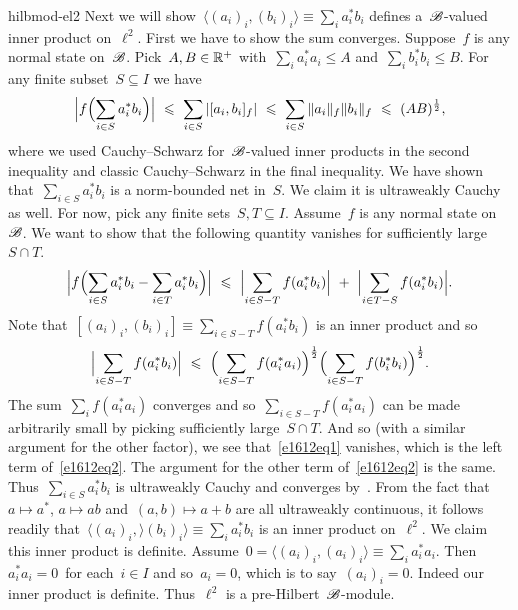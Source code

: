 \begin{solution}{hilbmod-el2}
    Next we will show~$\langle (a_i)_i , (b_i)_i \rangle \equiv
        \sum_i a_i^* b_i$ defines a~$\mathscr{B}$-valued inner product
        on~$\ell^2$.
    First we have to show the sum converges.
    Suppose~$f$ is any normal state on~$\mathscr{B}$.
Pick~$A,B\in \mathbb{R}^+$
    with~$\sum_i a_i^*a_i \leq A$
    and~$\sum_i b_i^*b_i \leq B$.
For any finite subset~$S \subseteq I$
    we have
\begin{equation*}
    \Bigl|f \Bigl( \sum_{ i \in S} a_i^*b_i \Bigr) \Bigr|
    \ \leq \  \sum_{i \in S} | [a_i,b_i]_f | \ \leq \ 
    \sum_{i \in S} \|a_i\|_f \|b_i\|_f
    \ \leq\ (AB)^{\frac{1}{2}},
\end{equation*}
where we used Cauchy--Schwarz for~$\mathscr{B}$-valued inner products
    in the second inequality and classic
    Cauchy--Schwarz in the final inequality.
We have shown that~$\sum_{i \in S} a_i^*b_i$
    is a norm-bounded net in~$S$.
    We claim it is ultraweakly Cauchy as well.
For now, pick any finite sets~$S,T \subseteq I$.
Assume~$f$ is any normal state on~$\mathscr{B}$.
We want to show that the following quantity vanishes
    for sufficiently large~$S \cap T$.
\begin{equation}\label{e1612eq2}
\Bigl| f \Bigl( \sum_{i \in S} a_i^*b_i
                - \sum_{i \in T} a_i^*b_i \Bigr)\Bigr|
                \ \leq \ 
                \Bigl| \sum_{i \in S - T} f(a_i^*b_i) \Bigr|
                    \ +\  \Bigl| \sum_{i \in T -S} f(a_i^*b_i) \Bigr|.
\end{equation}
Note that~$[ (a_i)_i, (b_i)_i ] \equiv \sum_{i\in S-T} f(a_i^*b_i)$
    is an inner product and so
\begin{equation}\label{e1612eq1}
        \Bigl| \sum_{i \in S - T} f(a_i^*b_i) \Bigr|
        \ \leq \ 
         \Bigl( \sum_{i \in S - T} f(a_i^*a_i) \Bigr)^{\frac{1}{2}}
         \Bigl( \sum_{i \in S - T} f(b_i^*b_i) \Bigr)^{\frac{1}{2}}.
\end{equation}
The sum~$\sum_i f(a_i^*a_i)$ converges
    and so~$\sum_{i \in S - T} f(a_i^*a_i)$
    can be made arbitrarily small
    by picking sufficiently large~$S\cap T$.
And so (with a similar argument for the other factor),
    we see that~\eqref{e1612eq1} vanishes,
    which is the left term of~\eqref{e1612eq2}.
The argument for the other term of~\eqref{e1612eq2} is the same.
Thus~$\sum_{i \in S} a_i^*b_i$ is ultraweakly Cauchy
    and converges by~.
From the fact that~$a \mapsto a^*$,
    $a \mapsto ab$ and~$(a,b) \mapsto a+b$
    are all ultraweakly continuous,
    it follows readily that~$\langle (a_i)_i , \rangle (b_i)_i\rangle \equiv
        \sum_i a_i^*b_i$ is an inner product on~$\ell^2$.
    We claim this inner product is definite.
Assume~$0 = \langle (a_i)_i, (a_i)_i\rangle \equiv \sum_i a_i^*a_i$.
Then~$a_i^*a_i = 0$~for each~$i \in I$ and so~$a_i = 0$,
    which is to say~$(a_i)_i = 0$. Indeed our inner product is definite.
    Thus~$\ell^2$ is a pre-Hilbert~$\mathscr{B}$-module.


\end{solution}
